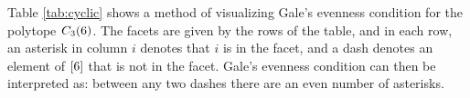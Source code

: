     \begin{Example}
        Table \ref{tab:cyclic} shows a method of visualizing Gale's evenness condition for the polytope \(\cyc63\).  The facets are given by the rows of the table, and in each row, an asterisk in column \(i\) denotes that \(i\) is in the facet, and a dash denotes an element of \(\brac6\) that is not in the facet.  Gale's evenness condition can then be interpreted as: between any two dashes there are an even number of asterisks.
            \begin{figure}[h!bt]
                \begin{floatrow}
\end{floatrow}
\end{figure}
\end{Example}
